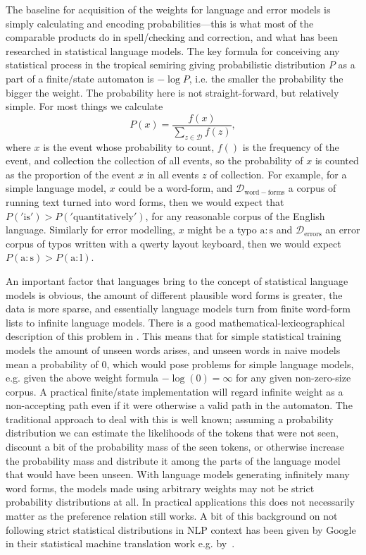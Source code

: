 \documentclass[officiallayout,final]{unihelcompling}
\begin{document}
The baseline for acquisition of the weights for language and error models is
simply calculating and encoding probabilities---this is what most of the
comparable products do in spell\-/checking and correction, and what has been
researched in statistical language models. The key formula for conceiving any
statistical process in the tropical semiring giving probabilistic distribution
$P$ as a part of a finite\-/state automaton is $-\log P$, i.e. the smaller the
probability the bigger the weight. The probability here is not
straight-forward, but relatively simple. For most things we calculate
\begin{equation} P(x) = \frac{f(x)}{\sum_{z \in \mathcal{D}} f(z)},
\end{equation} where $x$ is the event whose probability to count, $f()$ is the
frequency of the event, and \gls{collection} the collection of all events, so
the probability of $x$ is counted as the proportion of the event $x$ in all
events $z$ of \gls{collection}. For example, for a simple language model, $x$
could be a word-form, and $\mathcal{D}_\mathrm{word-forms}$ a corpus of running
text turned into word forms, then we would expect that $P('\mathrm{is}') >
P('\mathrm{quantitatively}')$, for any reasonable corpus of the English
language. Similarly for error modelling, $x$ might be a typo
$\mathrm{a}:\mathrm{s}$ and $\mathcal{D}_\mathrm{errors}$ an error corpus of
typos written with a qwerty layout keyboard, then we would expect
$P(\mathrm{a}:\mathrm{s}) > P(\mathrm{a}:\mathrm{l})$.

An important factor that  languages bring to the concept of
statistical language models is obvious, the amount of different plausible word
forms is greater, the data is more sparse, and essentially language models turn
from finite word-form lists to infinite language models.  There is a good
mathematical-lexicographical description of this problem in
\citet{kornai2002many}. This means that for simple statistical training models
the amount of unseen words arises, and unseen words in naive models mean a
probability of $0$, which would pose problems for simple language models, e.g.
given the above weight formula $-\log(0) = \infty$ for any given non-zero-size
corpus. A practical finite\-/state implementation will regard infinite weight
as a non-accepting path even if it were otherwise a valid path in the
automaton.  The traditional approach to deal with this is well known; assuming
a probability distribution we can estimate the likelihoods of the tokens that
were not seen, discount a bit of the probability mass of the seen tokens, or
otherwise increase the probability mass and distribute it among the parts of
the language model that would have been unseen. With language models generating
infinitely many word forms, the models made using arbitrary weights may not be
strict probability distributions at all. In practical applications this does
not necessarily matter as the preference relation still works. A bit of this
background on not following strict statistical distributions in NLP context has
been given by Google in their statistical machine translation work e.g.
by~\citet{brants2007large}.
\end{document}
